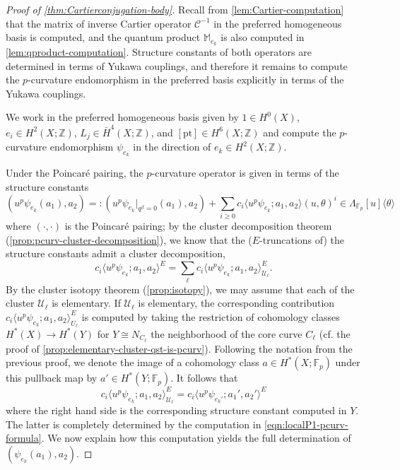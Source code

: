 \documentclass[reqno]{amsart}
\numberwithin{equation}{section}
\numberwithin{equation}{section}
\numberwithin{equation}{section}
\theoremstyle{definition}
\theoremstyle{remark}
\theoremstyle{remark}
\begin{document}
\begin{proof}[Proof of \cref{thm:Cartierconjugation-body}]

Recall from \cref{lem:Cartier-computation} that the matrix of inverse Cartier operator $\mathcal{C}^{-1}$ in the preferred homogeneous basis is computed, and the quantum product $\mathbb{M}_{e_k}$ is also computed in \cref{lem:qproduct-computation}. Structure constants of both operators are determined in terms of Yukawa couplings, and therefore it remains to compute the $p$-curvature endomorphism in the preferred basis explicitly in terms of the Yukawa couplings.

We work in the preferred homogeneous basis given by $1 \in H^0(X)$, $e_i \in H^2(X;\mathbb{Z})$, $L_j \in \bar{H}^4(X;\mathbb{Z})$, and $[\mathrm{pt}] \in H^6(X;\mathbb{Z})$ and compute the $p$-curvature endomorphism $ \psi_{e_k}$ in the direction of $e_k \in H^2(X;\mathbb{Z})$.

Under the Poincar\'e pairing, the $p$-curvature operator is given in terms of the structure constants
\begin{equation}
  \left(u^p  \psi_{e_k} (a_1) , a_2 \right) =:   \left(u^p  \psi_{e_k} |_{q^\beta = 0} (a_1) , a_2 \right)  + \sum_{i \ge 0} c_i \langle u^p  \psi_{e_k}; a_1, a_2 \rangle (u,\theta)^i \in \Lambda_{\mathbb{F}_p}[u]\langle \theta \rangle
\end{equation}
where $(\cdot, \cdot)$ is the Poincar\'e pairing; by the cluster decomposition theorem (\cref{prop:pcurv-cluster-decomposition}), we know that the ($E$-truncations of) the structure constants admit a cluster decomposition,
\begin{equation}
    c_i \langle u^p  \psi_{e_k}; a_1, a_2 \rangle^E  = \sum_{\ell} c_i \langle u^p \psi_{e_k} ; a_1, a_2 \rangle ^E_{\mathcal{U}_\ell}.
\end{equation}
By the cluster isotopy theorem (\cref{prop:isotopy}), we may assume that each of the cluster $\mathcal{U}_\ell$ is elementary. If $\mathcal{U}_\ell$ is elementary, the corresponding contribution $c_i \langle u^p \psi_{e_k} ; a_1, a_2 \rangle ^E_{U_\ell}$ is computed by taking the restriction of cohomology classes $H^*(X) \to H^*(Y)$ for $Y \cong N_{C_\ell}$ the neighborhood of the core curve $C_\ell$ (cf. the proof of \cref{prop:elementary-cluster-qst-is-pcurv}). Following the notation from the previous proof, we denote the image of a cohomology class $a \in H^*(X;\mathbb{F}_p)$ under this pullback map by $a' \in H^*(Y;\mathbb{F}_p)$. It follows that
\begin{equation}
    c_i \langle  u^p \psi_{e_k}; a_1, a_2 \rangle^E_{\mathcal{U}_\ell}  = c_i \langle u^p  \psi_{e_k'} ; a_1', a_2' \rangle^E
\end{equation}
where the right hand side is the corresponding structure constant computed in $Y$.  The latter is completely determined by the computation in \cref{eqn:localP1-pcurv-formula}. We now explain how this computation yields the full determination of $(\psi_{e_k}(a_1), a_2)$.



\end{proof}
\end{document}
